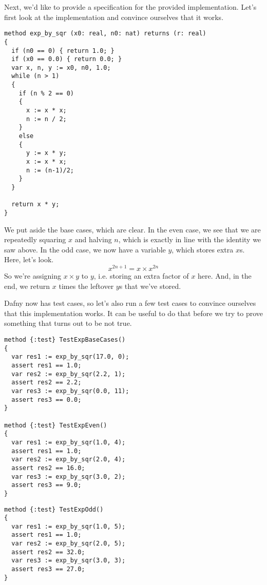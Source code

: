 \documentclass[11pt]{article}
\begin{document}
Next, we'd like to provide a specification for the provided implementation. Let's first look at the implementation and convince ourselves that it works.
\begin{lstlisting}[language=dafny]
method exp_by_sqr (x0: real, n0: nat) returns (r: real)
{
  if (n0 == 0) { return 1.0; }
  if (x0 == 0.0) { return 0.0; }
  var x, n, y := x0, n0, 1.0;
  while (n > 1)
  {
    if (n % 2 == 0)
    {
      x := x * x;
      n := n / 2;
    }
    else
    {
      y := x * y;
      x := x * x;
      n := (n-1)/2;
    }
  }

  return x * y;
}
\end{lstlisting}
We put aside the base cases, which are clear.
In the even case, we see that we are repeatedly squaring $x$ and halving $n$, which is exactly in line with the identity we saw above.
In the odd case, we now have a variable $y$, which stores extra $x$s. Here, let's look.
\[ x^{2n+1} = x \times x^{2n} \]
So we're assigning $x \times y$ to $y$, i.e. storing an extra factor of $x$ here. And, in the end, we return $x$ times the leftover $y$s
that we've stored.

Dafny now has test cases, so let's also run a few test cases to convince ourselves that this implementation works.
It can be useful to do that before we try to prove something that turns out to be not true.

  \begin{minipage}{.45\textwidth}
\begin{lstlisting}[language=dafny]
method {:test} TestExpBaseCases()
{
  var res1 := exp_by_sqr(17.0, 0);
  assert res1 == 1.0;
  var res2 := exp_by_sqr(2.2, 1);
  assert res2 == 2.2;
  var res3 := exp_by_sqr(0.0, 11);
  assert res3 == 0.0;
}

method {:test} TestExpEven()
{
  var res1 := exp_by_sqr(1.0, 4);
  assert res1 == 1.0;
  var res2 := exp_by_sqr(2.0, 4);
  assert res2 == 16.0;
  var res3 := exp_by_sqr(3.0, 2);
  assert res3 == 9.0;
}
\end{lstlisting}
\end{minipage}
  \begin{minipage}{.45\textwidth}
\begin{lstlisting}[language=dafny]
method {:test} TestExpOdd()
{
  var res1 := exp_by_sqr(1.0, 5);
  assert res1 == 1.0;
  var res2 := exp_by_sqr(2.0, 5);
  assert res2 == 32.0;
  var res3 := exp_by_sqr(3.0, 3);
  assert res3 == 27.0;
}
\end{lstlisting}
  \end{minipage}
\end{document}
